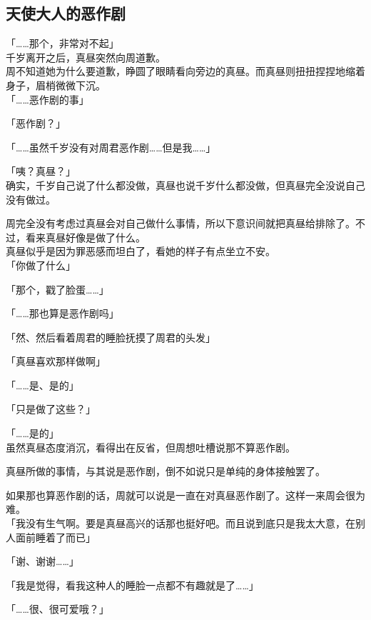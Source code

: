 \subsection{天使大人的恶作剧}

「……那个，非常对不起」\\

千岁离开之后，真昼突然向周道歉。\\

周不知道她为什么要道歉，睁圆了眼睛看向旁边的真昼。而真昼则扭扭捏捏地缩着身子，眉梢微微下沉。\\

「……恶作剧的事」

「恶作剧？」

「……虽然千岁没有对周君恶作剧……但是我……」

「咦？真昼？」\\

确实，千岁自己说了什么都没做，真昼也说千岁什么都没做，但真昼完全没说自己没有做过。

周完全没有考虑过真昼会对自己做什么事情，所以下意识间就把真昼给排除了。不过，看来真昼好像是做了什么。\\

真昼似乎是因为罪恶感而坦白了，看她的样子有点坐立不安。\\

「你做了什么」

「那个，戳了脸蛋……」

「……那也算是恶作剧吗」

「然、然后看着周君的睡脸抚摸了周君的头发」

「真昼喜欢那样做啊」

「……是、是的」

「只是做了这些？」

「……是的」\\

虽然真昼态度消沉，看得出在反省，但周想吐槽说那不算恶作剧。

真昼所做的事情，与其说是恶作剧，倒不如说只是单纯的身体接触罢了。

如果那也算恶作剧的话，周就可以说是一直在对真昼恶作剧了。这样一来周会很为难。\\

「我没有生气啊。要是真昼高兴的话那也挺好吧。而且说到底只是我太大意，在别人面前睡着了而已」

「谢、谢谢……」

「我是觉得，看我这种人的睡脸一点都不有趣就是了……」

「……很、很可爱哦？」

